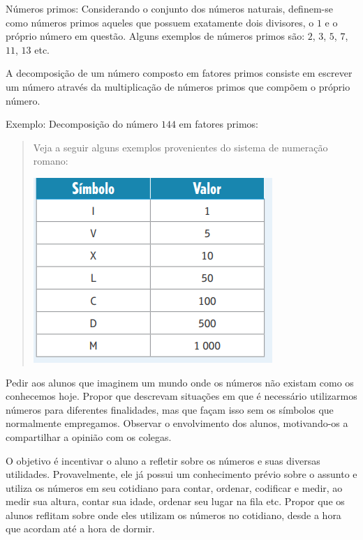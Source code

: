 Números primos: Considerando o conjunto dos números naturais, definem-se
como números primos aqueles que possuem exatamente dois divisores, o $1$ e
o próprio número em questão. Alguns exemplos de números primos são: $2$,
$3$, $5$, $7$, $11$, $13$ etc.

A decomposição de um número composto em fatores primos consiste em
escrever um número através da multiplicação de números primos que
compõem o próprio número.

Exemplo: Decomposição do número $144$ em fatores primos: 


\begin{quote}
Veja a seguir alguns exemplos provenientes do sistema de numeração
romano:


\includegraphics[width=3.5625in,height=2.76042in]{./imgSAEB_6_MAT/media/image5.png}
\end{quote}

Pedir aos alunos que imaginem um mundo onde os números não existam como
os conhecemos hoje. Propor que descrevam situações em que é necessário
utilizarmos números para diferentes finalidades, mas que façam isso sem
os símbolos que normalmente empregamos. Observar o envolvimento dos
alunos, motivando-os a compartilhar a opinião com os colegas.

O objetivo é incentivar o aluno a refletir sobre os números e suas
diversas utilidades. Provavelmente, ele já possui um conhecimento prévio
sobre o assunto e utiliza os números em seu cotidiano para contar,
ordenar, codificar e medir, ao medir sua altura, contar sua idade,
ordenar seu lugar na fila etc. Propor que os alunos reflitam sobre onde
eles utilizam os números no cotidiano, desde a hora que acordam até a
hora de dormir.



